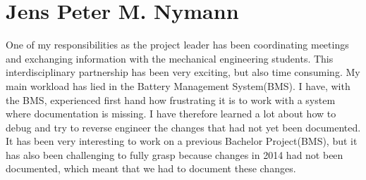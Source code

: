 \section{Jens Peter M. Nymann}
One of my responsibilities as the project leader has been coordinating meetings and exchanging information with the mechanical engineering students. This interdisciplinary partnership has been very exciting, but also time consuming. My main workload has lied in the Battery Management System(BMS). I have, with the BMS, experienced first hand how frustrating it is to work with a system where documentation is missing. I have therefore learned a lot about how to debug and try to reverse engineer the changes that had not yet been documented. It has been very interesting to work on a previous Bachelor Project(BMS), but it has also been challenging to fully grasp because changes in 2014 had not been documented, which meant that we had to document these changes.